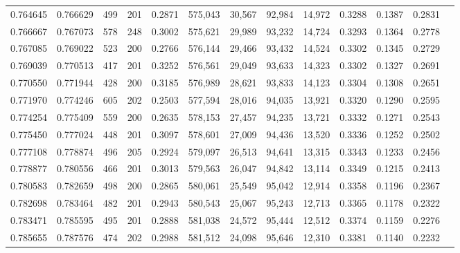 \begin{tabular}{rrrrrrrrrrrrr}
0.764645 & 0.766629 &    499 &   201 &                                     0.2871 & 575,043 &  30,567 &  92,984 &  14,972 & 0.3288 & 0.1387 & 0.2831 \\
0.766667 & 0.767073 &    578 &   248 &                                     0.3002 & 575,621 &  29,989 &  93,232 &  14,724 & 0.3293 & 0.1364 & 0.2778 \\
0.767085 & 0.769022 &    523 &   200 &                                     0.2766 & 576,144 &  29,466 &  93,432 &  14,524 & 0.3302 & 0.1345 & 0.2729 \\
0.769039 & 0.770513 &    417 &   201 &                                     0.3252 & 576,561 &  29,049 &  93,633 &  14,323 & 0.3302 & 0.1327 & 0.2691 \\
0.770550 & 0.771944 &    428 &   200 &                                     0.3185 & 576,989 &  28,621 &  93,833 &  14,123 & 0.3304 & 0.1308 & 0.2651 \\
0.771970 & 0.774246 &    605 &   202 &                                     0.2503 & 577,594 &  28,016 &  94,035 &  13,921 & 0.3320 & 0.1290 & 0.2595 \\
0.774254 & 0.775409 &    559 &   200 &                                     0.2635 & 578,153 &  27,457 &  94,235 &  13,721 & 0.3332 & 0.1271 & 0.2543 \\
0.775450 & 0.777024 &    448 &   201 &                                     0.3097 & 578,601 &  27,009 &  94,436 &  13,520 & 0.3336 & 0.1252 & 0.2502 \\
0.777108 & 0.778874 &    496 &   205 &                                     0.2924 & 579,097 &  26,513 &  94,641 &  13,315 & 0.3343 & 0.1233 & 0.2456 \\
0.778877 & 0.780556 &    466 &   201 &                                     0.3013 & 579,563 &  26,047 &  94,842 &  13,114 & 0.3349 & 0.1215 & 0.2413 \\
0.780583 & 0.782659 &    498 &   200 &                                     0.2865 & 580,061 &  25,549 &  95,042 &  12,914 & 0.3358 & 0.1196 & 0.2367 \\
0.782698 & 0.783464 &    482 &   201 &                                     0.2943 & 580,543 &  25,067 &  95,243 &  12,713 & 0.3365 & 0.1178 & 0.2322 \\
0.783471 & 0.785595 &    495 &   201 &                                     0.2888 & 581,038 &  24,572 &  95,444 &  12,512 & 0.3374 & 0.1159 & 0.2276 \\
0.785655 & 0.787576 &    474 &   202 &                                     0.2988 & 581,512 &  24,098 &  95,646 &  12,310 & 0.3381 & 0.1140 & 0.2232 \\

\end{tabular}
